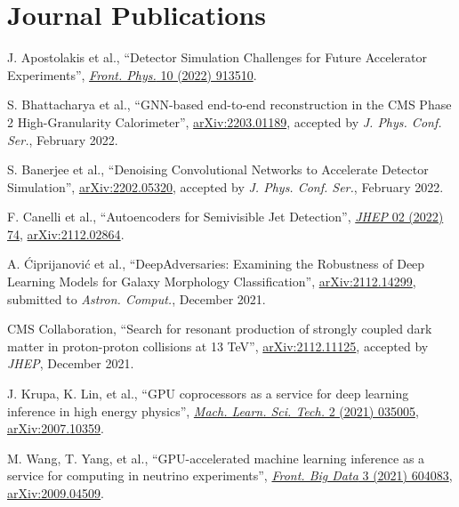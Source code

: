 \section{Journal Publications}
\begin{description}[leftmargin=12pt,font=\normalfont,labelsep=0em]
\item J. Apostolakis et al., ``Detector Simulation Challenges for Future Accelerator Experiments'', \href{https://doi.org/10.3389/fphy.2022.913510}{\emph{Front. Phys.} 10 (2022) 913510}.
\item \begin{sloppypar}S. Bhattacharya et al., ``GNN-based end-to-end reconstruction in the CMS Phase 2 High-Granularity Calorimeter'', \href{https://arxiv.org/abs/2203.01189}{arXiv:2203.01189}, accepted by \emph{J. Phys. Conf. Ser.}, February 2022.\end{sloppypar}
\item S. Banerjee et al., ``Denoising Convolutional Networks to Accelerate Detector Simulation'', \href{https://arxiv.org/abs/2202.05320}{arXiv:2202.05320}, accepted by \emph{J. Phys. Conf. Ser.}, February 2022.
\item F. Canelli et al., ``Autoencoders for Semivisible Jet Detection'', \href{https://doi.org/10.1007/JHEP02(2022)074}{\emph{JHEP} 02 (2022) 74}, \href{https://arxiv.org/abs/2112.02864}{arXiv:2112.02864}.
\item A. \'Ciprijanovi\'c et al., ``DeepAdversaries: Examining the Robustness of Deep Learning Models for Galaxy Morphology Classification'', \href{https://arxiv.org/abs/2112.14299}{arXiv:2112.14299}, submitted to \emph{Astron. Comput.}, December 2021.
\item CMS Collaboration, ``Search for resonant production of strongly coupled dark matter in proton-proton collisions at 13 TeV'', \href{https://arxiv.org/abs/2112.11125}{arXiv:2112.11125}, accepted by \emph{JHEP}, December 2021.
\item J. Krupa, K. Lin, et al., ``GPU coprocessors as a service for deep learning inference in high energy physics'', \href{https://doi.org/10.1088/2632-2153/abec21}{\emph{Mach. Learn. Sci. Tech.} 2 (2021) 035005}, \href{https://arxiv.org/abs/2007.10359}{arXiv:2007.10359}.
\item M. Wang, T. Yang, et al., ``GPU-accelerated machine learning inference as a service for computing in neutrino experiments'', \href{https://doi.org/10.3389/fdata.2020.604083}{\emph{Front. Big Data} 3 (2021) 604083}, \href{https://arxiv.org/abs/2009.04509}{arXiv:2009.04509}.

\end{description}
